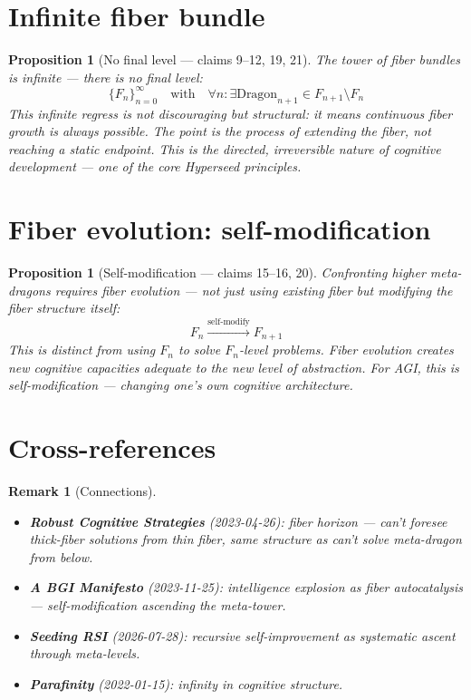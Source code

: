\documentclass[11pt,a4paper]{article}
\newtheorem{proposition}[definition]{Proposition}
\newtheorem{remark}[definition]{Remark}
\begin{document}
\section{Infinite fiber bundle}

\begin{proposition}[No final level --- claims 9--12, 19, 21]
The tower of fiber bundles is infinite --- there is no final level:
\[
  \{F_n\}_{n=0}^{\infty} \quad \text{with} \quad
  \forall n: \exists \text{Dragon}_{n+1} \in F_{n+1} \setminus F_n
\]
This infinite regress is not discouraging but structural: it means
continuous fiber growth is always possible. The point is the process
of extending the fiber, not reaching a static endpoint. This is the
directed, irreversible nature of cognitive development --- one of the
core Hyperseed principles.
\end{proposition}

\section{Fiber evolution: self-modification}

\begin{proposition}[Self-modification --- claims 15--16, 20]
Confronting higher meta-dragons requires fiber evolution --- not just
using existing fiber but modifying the fiber structure itself:
\[
  F_n \xrightarrow{\text{self-modify}} F_{n+1}
\]
This is distinct from using $F_n$ to solve $F_n$-level problems.
Fiber evolution creates new cognitive capacities adequate to the
new level of abstraction. For AGI, this is self-modification ---
changing one's own cognitive architecture.
\end{proposition}

\section{Cross-references}

\begin{remark}[Connections]
\begin{itemize}
\item \textbf{Robust Cognitive Strategies} (2023-04-26): fiber horizon ---
  can't foresee thick-fiber solutions from thin fiber, same structure
  as can't solve meta-dragon from below.
\item \textbf{A BGI Manifesto} (2023-11-25): intelligence explosion as
  fiber autocatalysis --- self-modification ascending the meta-tower.
\item \textbf{Seeding RSI} (2026-07-28): recursive self-improvement as
  systematic ascent through meta-levels.
\item \textbf{Parafinity} (2022-01-15): infinity in cognitive structure.
\end{itemize}
\end{remark}
\end{document}
